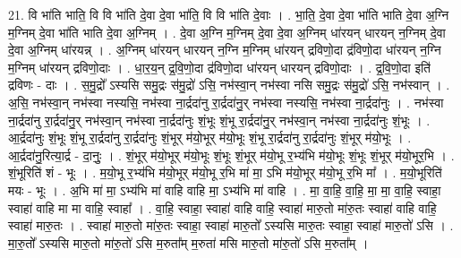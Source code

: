 \documentclass[17pt]{extarticle}
\begin{document}
21. वि भा॑ति भाति॒ वि वि भा॑ति दे॒वा दे॒वा भा॑ति॒ वि वि भा॑ति दे॒वाः । . भा॒ति॒ दे॒वा दे॒वा भा॑ति भाति दे॒वा अ॒ग्नि म॒ग्निम् दे॒वा भा॑ति भाति दे॒वा अ॒ग्निम् । . दे॒वा अ॒ग्नि म॒ग्निम् दे॒वा दे॒वा अ॒ग्निम् धा॑रयन् धारयन् न॒ग्निम् दे॒वा दे॒वा अ॒ग्निम् धा॑रयन्न् । . अ॒ग्निम् धा॑रयन् धारयन् न॒ग्नि म॒ग्निम् धा॑रयन् द्रविणो॒दा द्र॑विणो॒दा धा॑रयन् न॒ग्नि म॒ग्निम् धा॑रयन् द्रविणो॒दाः । . धा॒र॒य॒न् द्र॒वि॒णो॒दा द्र॑विणो॒दा धा॑रयन् धारयन् द्रविणो॒दाः । . द्र॒वि॒णो॒दा इति॑ द्रविणः - दाः । . स॒मु॒द्रो᳚ ऽस्यसि समु॒द्रः स॑मु॒द्रो॑ ऽसि॒ नभ॑स्वा॒न् नभ॑स्वा नसि समु॒द्रः स॑मु॒द्रो॑ ऽसि॒ नभ॑स्वान् । . अ॒सि॒ नभ॑स्वा॒न् नभ॑स्वा नस्यसि॒ नभ॑स्वा ना॒र्द्रदा॑नु रा॒र्द्रदा॑नु॒र् नभ॑स्वा नस्यसि॒ नभ॑स्वा ना॒र्द्रदा॑नुः । . नभ॑स्वा ना॒र्द्रदा॑नु रा॒र्द्रदा॑नु॒र् नभ॑स्वा॒न् नभ॑स्वा ना॒र्द्रदा॑नुः शं॒भूः शं॒भू रा॒र्द्रदा॑नु॒र् नभ॑स्वा॒न् नभ॑स्वा ना॒र्द्रदा॑नुः शं॒भूः । . आ॒र्द्रदा॑नुः शं॒भूः शं॒भू रा॒र्द्रदा॑नु रा॒र्द्रदा॑नुः शं॒भूर् म॑यो॒भूर् म॑यो॒भूः शं॒भू रा॒र्द्रदा॑नु रा॒र्द्रदा॑नुः शं॒भूर् म॑यो॒भूः । . आ॒र्द्रदा॑नु॒रित्या॒र्द्र - दा॒नुः॒ । . शं॒भूर् म॑यो॒भूर् म॑यो॒भूः शं॒भूः शं॒भूर् म॑यो॒भू र॒भ्य॑भि म॑यो॒भूः शं॒भूः शं॒भूर् म॑यो॒भूर॒भि । . शं॒भूरिति॑ शं - भूः । . म॒यो॒भू र॒भ्य॑भि म॑यो॒भूर् म॑यो॒भू र॒भि मा॑ मा॒ ऽभि म॑यो॒भूर् म॑यो॒भू र॒भि मा᳚ । . म॒यो॒भूरिति॑ मयः - भूः । . अ॒भि मा॑ मा॒ ऽभ्य॑भि मा॑ वाहि वाहि मा॒ ऽभ्य॑भि मा॑ वाहि । . मा॒ वा॒हि॒ वा॒हि॒ मा॒ मा॒ वा॒हि॒ स्वाहा॒ स्वाहा॑ वाहि मा मा वाहि॒ स्वाहा᳚ । . वा॒हि॒ स्वाहा॒ स्वाहा॑ वाहि वाहि॒ स्वाहा॑ मारु॒तो मा॑रु॒तः स्वाहा॑ वाहि वाहि॒ स्वाहा॑ मारु॒तः । . स्वाहा॑ मारु॒तो मा॑रु॒तः स्वाहा॒ स्वाहा॑ मारु॒तो᳚ ऽस्यसि मारु॒तः स्वाहा॒ स्वाहा॑ मारु॒तो॑ ऽसि । . मा॒रु॒तो᳚ ऽस्यसि मारु॒तो मा॑रु॒तो॑ ऽसि म॒रुता᳚म् म॒रुता॑ मसि मारु॒तो मा॑रु॒तो॑ ऽसि म॒रुता᳚म् । \newline
\end{document}
